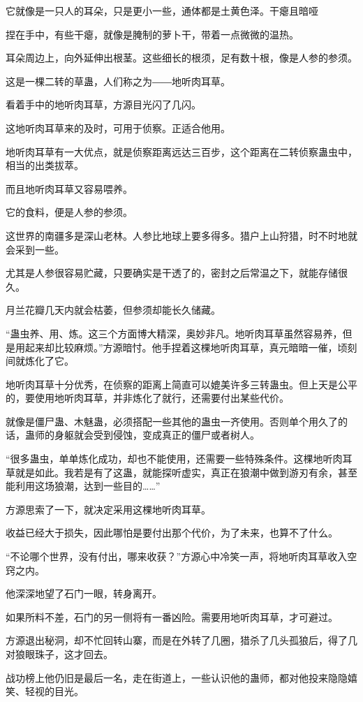 \begin{this_body}
它就像是一只人的耳朵，只是更小一些，通体都是土黄色泽。干瘪且暗哑

捏在手中，有些干瘪，就像是腌制的萝卜干，带着一点微微的温热。

耳朵周边上，向外延伸出根茎。这些细长的根须，足有数十根，像是人参的参须。

这是一棵二转的草蛊，人们称之为――地听肉耳草。

看着手中的地听肉耳草，方源目光闪了几闪。

这地听肉耳草来的及时，可用于侦察。正适合他用。

地听肉耳草有一大优点，就是侦察距离远达三百步，这个距离在二转侦察蛊虫中，相当的出类拔萃。

而且地听肉耳草又容易喂养。

它的食料，便是人参的参须。

这世界的南疆多是深山老林。人参比地球上要多得多。猎户上山狩猎，时不时地就会采到一些。

尤其是人参很容易贮藏，只要确实是干透了的，密封之后常温之下，就能存储很久。

月兰花瓣几天内就会枯萎，但参须却能长久储藏。

“蛊虫养、用、炼。这三个方面博大精深，奥妙非凡。地听肉耳草虽然容易养，但是用起来却比较麻烦。”方源暗忖。他手捏着这棵地听肉耳草，真元暗暗一催，顷刻间就炼化了它。

地听肉耳草十分优秀，在侦察的距离上简直可以媲美许多三转蛊虫。但上天是公平的，要使用地听肉耳草，并非炼化了就行，还需要付出某些代价。

就像是僵尸蛊、木魅蛊，必须搭配一些其他的蛊虫一齐使用。否则单个用久了的话，蛊师的身躯就会受到侵蚀，变成真正的僵尸或者树人。

“很多蛊虫，单单炼化成功，却也不能使用，还需要一些特殊条件。这棵地听肉耳草就是如此。我若是有了这蛊，就能探听虚实，真正在狼潮中做到游刃有余，甚至能利用这场狼潮，达到一些目的……”

方源思索了一下，就决定采用这棵地听肉耳草。

收益已经大于损失，因此哪怕是要付出那个代价，为了未来，也算不了什么。

“不论哪个世界，没有付出，哪来收获？”方源心中冷笑一声，将地听肉耳草收入空窍之内。

他深深地望了石门一眼，转身离开。

如果所料不差，石门的另一侧将有一番凶险。需要用地听肉耳草，才可避过。

方源退出秘洞，却不忙回转山寨，而是在外转了几圈，猎杀了几头孤狼后，得了几对狼眼珠子，这才回去。

战功榜上他仍旧是最后一名，走在街道上，一些认识他的蛊师，都对他投来隐隐嬉笑、轻视的目光。


\end{this_body}
